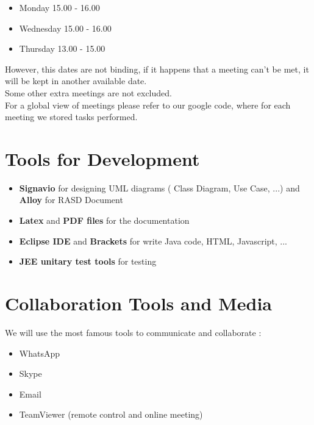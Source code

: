 \documentclass[12pt]{book}
\begin{document}
\begin{itemize}
	\item Monday 15.00 - 16.00
	\item	 Wednesday 15.00 - 16.00
	\item Thursday	13.00 - 15.00
\end{itemize}

However, this dates are not binding, if it happens that a meeting can't be met, it will be kept in another available date. \\
Some other extra meetings are not excluded.   \\
For a global view of meetings please refer to our google code, where for each meeting we stored tasks performed. \\

\section{Tools for Development}

\begin{itemize}
	\item \textbf{Signavio} for designing UML diagrams ( Class Diagram, Use Case, ...) and \textbf{Alloy} for RASD Document
	\item \textbf{Latex} and \textbf{PDF files} for the documentation
	\item \textbf{Eclipse IDE} and \textbf{Brackets} for write Java code, HTML, Javascript, ... 
	\item \textbf{JEE unitary test tools} for testing
\end{itemize}
\section{Collaboration Tools and  Media}

We will use the most famous tools to communicate and collaborate : 
\begin{itemize}
	\item WhatsApp 
	\item Skype
	\item Email 
	\item TeamViewer (remote control and online meeting)
\end{itemize}
\end{document}
